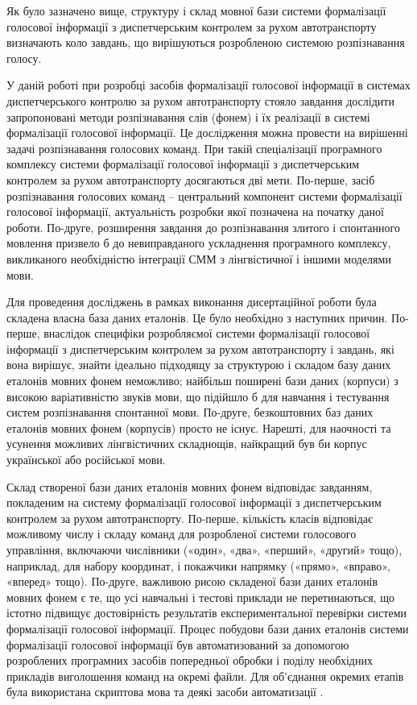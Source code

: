 Як було зазначено вище, структуру і склад мовної бази системи формалізації голосової інформації з диспетчерським контролем за рухом автотранспорту визначають коло завдань, що вирішуються розробленою системою розпізнавання голосу.

У даній роботі при розробці засобів формалізації голосової інформації в системах диспетчерського контролю за рухом автотранспорту стояло завдання дослідити запропоновані методи розпізнавання слів (фонем) і їх реалізації в системі формалізації голосової інформації. Це дослідження можна провести на вирішенні задачі розпізнавання голосових команд. При такій спеціалізації програмного комплексу системи формалізації голосової інформації з диспетчерським контролем за рухом автотранспорту досягаються дві мети. По-перше, засіб розпізнавання голосових команд – центральний компонент системи формалізації голосової інформації, актуальність розробки якої позначена на початку даної роботи. По-друге, розширення завдання до розпізнавання злитого і спонтанного мовлення призвело б до невиправданого ускладнення програмного комплексу, викликаного необхідністю інтеграції СММ з лінгвістичної і іншими моделями мови.

Для проведення досліджень в рамках виконання дисертаційної роботи була складена власна база даних еталонів. Це було необхідно з наступних причин. По-перше, внаслідок специфіки розробляємої системи формалізації голосової інформації з диспетчерським контролем за рухом автотранспорту і завдань, які вона вирішує, знайти ідеально підходящу за структурою і складом базу даних еталонів мовних фонем неможливо; найбільш поширені бази даних (корпуси) з високою варіативністю звуків мови, що підійшло б для навчання і тестування систем розпізнавання спонтанної мови. По-друге, безкоштовних баз даних еталонів мовних фонем (корпусів) просто не існує. Нарешті, для наочності та усунення можливих лінгвістичних складнощів, найкращий був би корпус української або російської мови.

Склад створеної бази даних еталонів мовних фонем відповідає завданням, покладеним на систему формалізації голосової інформації з диспетчерським контролем за рухом автотранспорту. По-перше, кількість класів відповідає можливому числу і складу команд для розробленої системи голосового управління, включаючи числівники («один», «два», «перший», «другий» тощо), наприклад, для набору координат, і покажчики напрямку («прямо», «вправо», «вперед» тощо). По-друге, важливою рисою складеної бази даних еталонів мовних фонем є те, що усі навчальні і тестові приклади не перетинаються, що істотно підвищує достовірність результатів експериментальної перевірки системи формалізації голосової інформації. Процес побудови бази даних еталонів системи формалізації голосової інформації був автоматизований за допомогою розроблених програмних засобів попередньої обробки і поділу необхідних прикладів виголошення команд на окремі файли. Для об’єднання окремих етапів була використана скриптова мова та деякі засоби автоматизації \cite{tange_ole_2018_1146014}.

